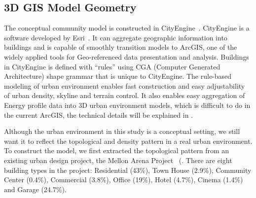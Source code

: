 \subsection{3D GIS Model Geometry}
The conceptual community model is constructed in
CityEngine~\cite{cityEngine2015}. CityEngine is a software developed
by Esri~\cite{Esri2015}. It can aggregate geographic information into
buildings and is capable of smoothly transition models to
ArcGIS\cite{ArcGIS2015}, one of the widely applied tools for
Geo-referenced data presentation and analysis. Buildings in CityEngine
is defined with ``rules'' using CGA (Computer Generated Architecture)
shape grammar that is unique to CityEngine. The rule-based modeling of
urban environment enables fast construction and easy adjustability of
urban density, skyline and terrain control. It also enables easy
aggregation of Energy profile data into 3D urban environment models,
which is difficult to do in the current ArcGIS, the technical details
will be explained in .

Although the urban environment in this study is a conceptual setting,
we still want it to reflect the topological and density pattern in a
real urban environment. To construct the model, we first extracted the
topological pattern from an existing urban design project, the Mellon
Arena Project~\cite{baird2014} (.  There are
eight building types in the project: Residential (43\%), Town House
(2.9\%), Community Center (0.4\%), Commercial (3.8\%), Office (19\%),
Hotel (4.7\%), Cinema (1.4\%) and Garage (24.7\%).

